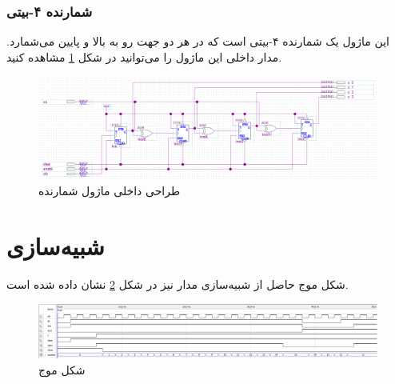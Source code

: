 \documentclass[12pt,onecolumn,a4paper,fleqn]{article}
\begin{document}
	\subsubsection{شمارنده ۴-بیتی}
	این ماژول یک شمارنده ۴-بیتی است که در هر دو جهت رو به بالا و پایین می‌شمارد. مدار داخلی این ماژول را می‌توانید در شکل \ref{fig:counter} مشاهده کنید.
	\begin{figure}[H]
		\centering
		\includegraphics[scale=0.4]{source/counter.png}
		\caption{طراحی داخلی ماژول شمارنده}
		\label{fig:counter}
	\end{figure}
 	
 	\pagebreak
 	\section{شبیه‌سازی}
 	شکل موج حاصل از شبیه‌سازی مدار نیز در شکل \ref{fig:simulation} نشان داده شده است.
 	\begin{figure}[H]
 		\centering
 		\includegraphics[scale=0.43]{source/simulation.png}
 		\caption{شکل موج}
 		\label{fig:simulation}
 	\end{figure}
 	
\end{document}

